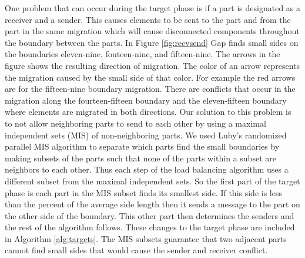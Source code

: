 \documentclass{thesis}
\begin{document}
One problem that can occur during the target phase is if a part is 
designated as a receiver and a sender. This causes elements to be sent 
to the part and from the part in the same migration which will cause 
disconnected components throughout the boundary between the parts. In Figure 
\ref{fig:recvsend} Gap finds small sides on the boundaries eleven-nine, 
fouteen-nine, and fifteen-nine.
The arrows in the figure shows the resulting direction of migration. The color 
of an arrow represents the migration caused by the small side of that color. 
For example the red arrows are for the fifteen-nine boundary migration. There 
are 
conflicts that occur in the migration along the fourteen-fifteen boundary and 
the eleven-fifteen 
boundary where elements are migrated in both directions.  Our solution to this 
problem is to not allow neighboring parts to send to each other by using a 
maximal independent sets (MIS) of non-neighboring parts. We used Luby's 
randomized parallel MIS algorithm \cite{luby} to separate which parts find the 
small boundaries by making subsets of the parts such that none of the parts 
within a subset are neighbors to each other. Thus each step of the load 
balancing algorithm uses a different subset from the maximal independent sets. 
So the first part of the target phase is each part in the MIS subset 
finds its smallest side. If this side is less than the percent of the average 
side length then it sends a message to the part on the other side of the 
boundary. This other part then determines the senders and the rest of the 
algorithm follows. These changes to the target phase are included in Algorithm 
\ref{alg:targets}. The MIS subsets guarantee that two adjacent parts cannot 
find small sides that would cause the sender and receiver conflict. 
\end{document}

